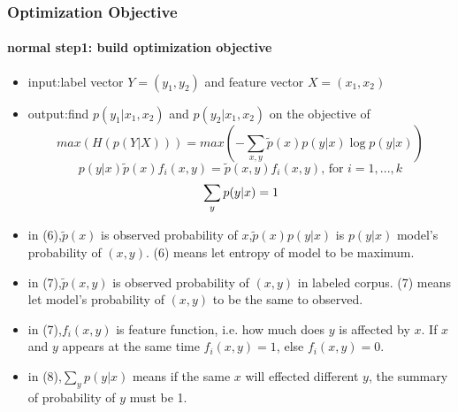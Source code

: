 \begin{frame}
\frametitle{Optimization Objective}
\framesubtitle{normal step1: build optimization objective}
	\begin{scriptsize}
	\begin{itemize}
		\item input:label vector $Y=(y_1,y_2)$ and feature vector $X=(x_1,x_2)$
		\item output:find $p(y_1|x_1,x_2)$ and $p(y_2|x_1,x_2)$ on the objective of
		\begin{equation}\label{maximumentropy}
			max(H(p(Y|X)))=max(-\sum_{x,y}\widetilde{p}(x)p(y|x)\log p(y|x))
		\end{equation}
		\begin{equation}
			p(y|x)\widetilde{p}({x})f_i(x,y)=\widetilde{p}(x,y)f_i(x,y)\text{, for } i=1,...,k
		\end{equation}
		\begin{equation}{\label{sum(p)}}
			\sum_{y}p(y|x)=1
		\end{equation}
		\item in (6),$\widetilde{p}({x})$ is observed probability of $x$,$\widetilde{p}(x)p(y|x)$ is $p(y|x)$ model's probability of $(x,y)$. (6) means let entropy of model to be maximum.
		\item in (7),$\widetilde{p}(x,y)$ is observed probability of $(x,y)$ in labeled corpus. (7) means let model's probability of $(x,y)$ to be the same to observed.
		\item in (7),$f_i(x,y)$ is feature function, i.e. how much does $y$ is affected by $x$. If $x$ and $y$ appears at the same time $f_i(x,y)=1$, else $f_i(x,y)=0$. 
		\item in (8),$\sum_{y}p(y|x)$ means if the same $x$ will effected different $y$, the summary of probability of $y$ must be 1. 
	\end{itemize}
	\end{scriptsize}
\end{frame}

